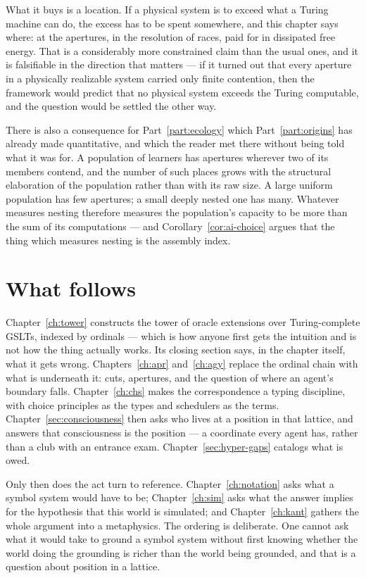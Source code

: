 What it buys is a location.
If a physical system is to exceed what a Turing machine can do, the
excess has to be spent somewhere, and this chapter says where: at the
apertures, in the resolution of races, paid for in dissipated free
energy.
That is a considerably more constrained claim than the usual ones, and it
is falsifiable in the direction that matters --- if it turned out that
every aperture in a physically realizable system carried only finite
contention, then the framework would predict that no physical system
exceeds the Turing computable, and the question would be settled the
other way.

There is also a consequence for Part~\ref{part:ecology} which
Part~\ref{part:origins} has already made quantitative, and which the
reader met there without being told what it was for.
A population of learners has apertures wherever two of its members
contend, and the number of such places grows with the structural
elaboration of the population rather than with its raw size.
A large uniform population has few apertures; a small deeply nested one
has many.
Whatever measures nesting therefore measures the population's capacity to
be more than the sum of its computations --- and
Corollary~\ref{cor:ai-choice} argues that the thing which measures
nesting is the assembly index.

\section{What follows}

Chapter~\ref{ch:tower} constructs the tower of oracle extensions over
Turing-complete GSLTs, indexed by ordinals --- which is how anyone first
gets the intuition and is not how the thing actually works.
Its closing section says, in the chapter itself, what it gets wrong.
Chapters~\ref{ch:apr} and~\ref{ch:agy} replace the ordinal chain with
what is underneath it: cuts, apertures, and the question of where an
agent's boundary falls.
Chapter~\ref{ch:chs} makes the correspondence a typing discipline, with
choice principles as the types and schedulers as the terms.
Chapter~\ref{sec:consciousness} then asks who lives at a position in that
lattice, and answers that consciousness is the position --- a coordinate
every agent has, rather than a club with an entrance exam.
Chapter~\ref{sec:hyper-gaps} catalogs what is owed.

Only then does the act turn to reference.
Chapter~\ref{ch:notation} asks what a symbol system would have to be;
Chapter~\ref{ch:sim} asks what the answer implies for the hypothesis that
this world is simulated; and Chapter~\ref{ch:kant} gathers the whole
argument into a metaphysics.
The ordering is deliberate.
One cannot ask what it would take to ground a symbol system without first
knowing whether the world doing the grounding is richer than the world
being grounded, and that is a question about position in a lattice.

